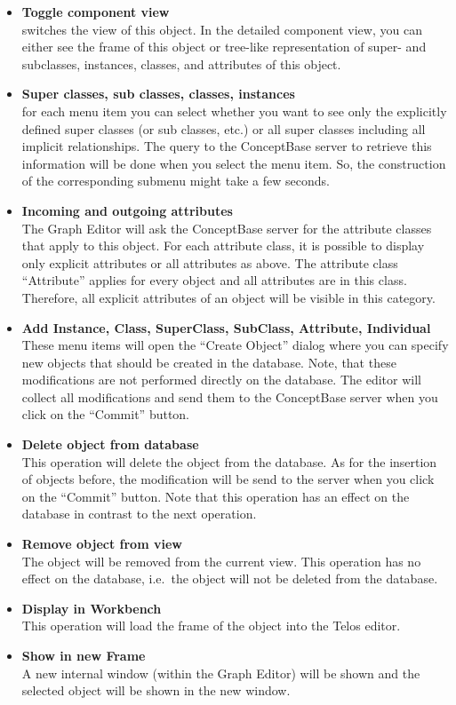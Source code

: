 \documentclass[10pt,a4paper]{article}
\begin{document}
\begin{itemize}
\item	{\bf Toggle component view} \\
	switches the view of this object. In the detailed component view,
	you can either see the frame of this object or tree-like
	representation of super- and subclasses, instances, classes, and
	attributes of this object.
\item	{\bf Super classes, sub classes, classes, instances}\\
    for each menu item you can select whether you want to
    see only the explicitly defined super classes (or sub classes, etc.)
    or all super classes including all implicit relationships.
    The query to the ConceptBase server to retrieve this information
    will be done when you select the menu item. So, the construction
    of the corresponding submenu might take a few seconds.
\item {\bf Incoming and outgoing attributes}\\
    The Graph Editor will ask the ConceptBase server for the attribute
    classes that apply to this object. For each attribute class, it is
    possible to display only explicit attributes or all attributes as above.
    The attribute class ``Attribute'' applies for every object and all
    attributes are in this class. Therefore, all explicit attributes of
    an object will be visible in this category.

\item {\bf Add Instance, Class, SuperClass, SubClass, Attribute, Individual}	\\
    These menu items will open the ``Create Object'' dialog where
    you can specify new objects that should be created in the database.
    Note, that these modifications are not performed directly on the
    database. The editor will collect all modifications and
    send them to the ConceptBase server when you click on the ``Commit''
    button.
\item {\bf Delete object from database} \\
    This operation will delete the object from the database. As for the
    insertion of objects before, the modification will be send to
    the server when you click on the ``Commit''
    button. Note that this operation has an effect on the database
    in contrast to the next operation.
\item {\bf Remove object from view} \\
    The object will be removed from the current view. This operation
    has no effect on the database, i.e.\ the object will not be deleted
    from the database.
\item {\bf Display in Workbench}\\
    This operation will load the frame of the object into the
    Telos editor.

\item {\bf Show in new Frame}\\
    A new internal window (within the Graph Editor) will be shown
    and the selected object will be shown in the new window.
\end{itemize}
\end{document}

